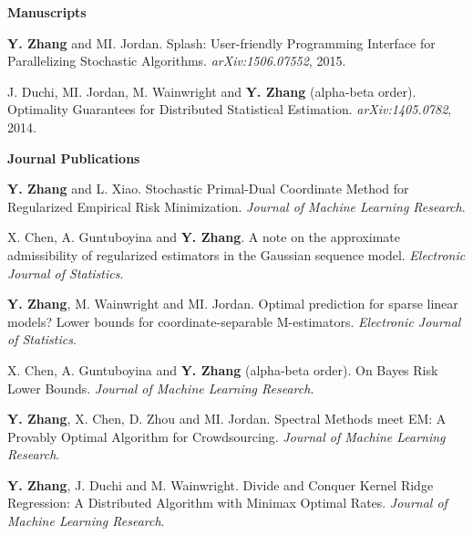 \documentclass{res}
\begin{document}
\begin{resume}
{\bf\Large Manuscripts}
\vspace{5pt}

\begin{enumerate}[label={[M\arabic*]}, ref={M\arabic*}]
\item \label{splash}\textbf{Y. Zhang} and MI. Jordan. Splash: User-friendly Programming Interface for Parallelizing Stochastic Algorithms. \emph{arXiv:1506.07552}, 2015.

\item J. Duchi, MI. Jordan, M. Wainwright and \textbf{Y. Zhang} (alpha-beta order). Optimality Guarantees for Distributed Statistical Estimation. \emph{arXiv:1405.0782}, 2014.\label{optimality}
\end{enumerate}

{\bf\Large Journal Publications}
\vspace{5pt}

\begin{enumerate}[label={[J\arabic*]}, ref={J\arabic*}]

\item \textbf{Y. Zhang} and L. Xiao. Stochastic Primal-Dual Coordinate Method for Regularized Empirical Risk Minimization.
\emph{Journal of Machine Learning Research}.\label{stochastic-jmlr}

\item X. Chen, A. Guntuboyina and \textbf{Y. Zhang}. A note on the approximate admissibility of regularized estimators in the Gaussian sequence model.
\emph{Electronic Journal of Statistics}.\label{a-note-ejs}

\item \textbf{Y. Zhang}, M. Wainwright and MI. Jordan. Optimal prediction for sparse linear models? Lower bounds for coordinate-separable M-estimators.\label{optimality-ejs}
\emph{Electronic Journal of Statistics}.

\item X. Chen, A. Guntuboyina and \textbf{Y. Zhang} (alpha-beta order). On Bayes Risk Lower Bounds.
\emph{Journal of Machine Learning Research}.\label{on-bayes-jmlr}

\item \textbf{Y. Zhang}, X. Chen, D. Zhou and MI. Jordan. Spectral Methods meet EM: A Provably Optimal Algorithm for Crowdsourcing.
\emph{Journal of Machine Learning Research}.\label{spectral-jmlr}

\item \textbf{Y. Zhang}, J. Duchi and M. Wainwright. Divide and Conquer Kernel Ridge Regression: A Distributed Algorithm with Minimax Optimal Rates.
\emph{Journal of Machine Learning Research}.\label{divide-jmlr}


\end{enumerate}
\end{resume}
\end{document}

